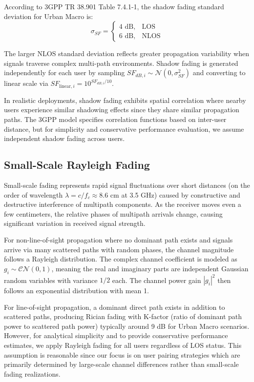 According to 3GPP TR 38.901 Table 7.4.1-1, the shadow fading standard deviation for Urban Macro is:
\begin{equation}
\sigma_{SF} = \begin{cases}
4 \text{ dB}, & \text{LOS} \\
6 \text{ dB}, & \text{NLOS}
\end{cases}
\end{equation}

The larger NLOS standard deviation reflects greater propagation variability when signals traverse complex multi-path environments. Shadow fading is generated independently for each user by sampling $SF_{dB,i} \sim \mathcal{N}(0, \sigma_{SF}^2)$ and converting to linear scale via $SF_{\text{linear},i} = 10^{SF_{dB,i}/10}$.

In realistic deployments, shadow fading exhibits spatial correlation where nearby users experience similar shadowing effects since they share similar propagation paths. The 3GPP model specifies correlation functions based on inter-user distance, but for simplicity and conservative performance evaluation, we assume independent shadow fading across users.

\subsection{Small-Scale Rayleigh Fading}

Small-scale fading represents rapid signal fluctuations over short distances (on the order of wavelength $\lambda = c/f_c \approx 8.6$ cm at 3.5 GHz) caused by constructive and destructive interference of multipath components. As the receiver moves even a few centimeters, the relative phases of multipath arrivals change, causing significant variation in received signal strength.

For non-line-of-sight propagation where no dominant path exists and signals arrive via many scattered paths with random phases, the channel magnitude follows a Rayleigh distribution. The complex channel coefficient is modeled as $g_i \sim \mathcal{CN}(0,1)$, meaning the real and imaginary parts are independent Gaussian random variables with variance $1/2$ each. The channel power gain $|g_i|^2$ then follows an exponential distribution with mean 1.

For line-of-sight propagation, a dominant direct path exists in addition to scattered paths, producing Rician fading with K-factor (ratio of dominant path power to scattered path power) typically around 9 dB for Urban Macro scenarios. However, for analytical simplicity and to provide conservative performance estimates, we apply Rayleigh fading for all users regardless of LOS status. This assumption is reasonable since our focus is on user pairing strategies which are primarily determined by large-scale channel differences rather than small-scale fading realizations.

